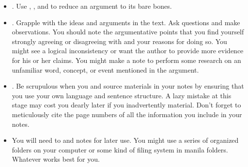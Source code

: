 \begin{itemize} \item {}. Use \hyperlink{summary}{\color{Ahrenge}{summary}}, \hyperlink{paraphrase}{\color{Ahrenge}{paraphrase}}, and \hyperlink{quotation}{\color{Ahrenge}{quotation}} to reduce an argument to its bare
bones.

\item {}. Grapple with the ideas and arguments in the text. Ask
questions and make observations. You should note the argumentative points that
you find yourself strongly agreeing or disagreeing with and your reasons for
doing so. You might see a logical inconsistency or want the author to provide
more evidence for his or her claims. You might make a note to perform some
research on an unfamiliar word, concept, or event mentioned in the argument.

\item {}. Be scrupulous when you \hyperlink{summary}{\color{Ahrenge}{summarize}} and \hyperlink{paraphrase}{\color{Ahrenge}{paraphrase}}
source materials in your notes by ensuring that you use your own language and
sentence structure. A lazy mistake at this stage may cost you dearly later if
you inadvertently \hyperlink{plagiarism}{\color{Ahrenge}{plagiarize}} material. Don't forget to meticulously cite the page numbers of all the information you include in your notes.

\item {} You will need to \hyperlink{joyofreuse}{\color{Ahrenge}{create a system for organizing and retaining these annotations}} and notes for later use. You might use a series of organized folders on your computer or some kind of filing system in manila folders. Whatever works best for you. 

\end{itemize}

